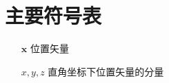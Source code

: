 \chapter{主要符号表}

\begin{itemize}[align=left]
    \item[$\bm x$] 位置矢量
    \item[$x,y,z$] 直角坐标下位置矢量的分量
\end{itemize}

